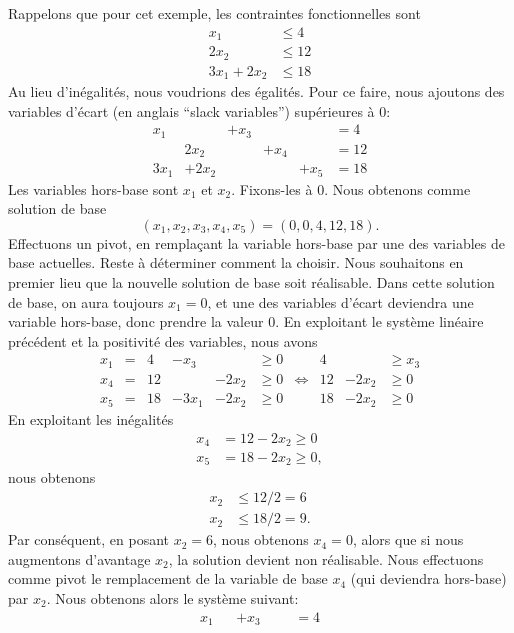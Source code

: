 \begin{example}
Rappelons que pour cet exemple, les contraintes fonctionnelles sont
\begin{eqnarray*}
x_1 & \leq 4 \\
2x_2 & \leq 12 \\
3x_1 + 2x_2 & \leq 18
\end{eqnarray*}
Au lieu d'inégalités, nous voudrions des égalités.
Pour ce faire, nous ajoutons des variables d'écart (en anglais ``slack variables'') supérieures à 0:
\[
\begin{matrix}
x_1 & & + x_3 & & & = 4 \\
& 2x_2 & & + x_4 & &  = 12\\
3x_1 & + 2x_2 & & & +x_5 & = 18
\end{matrix}
\]
Les variables hors-base sont $x_1$ et $x_2$. Fixons-les à 0.
Nous obtenons comme solution de base
\[
(x_1, x_2, x_3, x_4, x_5) = (0, 0, 4, 12, 18).
\]
Effectuons un pivot, en remplaçant la variable hors-base par une des variables de base actuelles.
Reste à déterminer comment la choisir.
Nous souhaitons en premier lieu que la nouvelle solution de base soit réalisable.
Dans cette solution de base, on aura toujours $x_1 = 0$, et une des variables d'écart deviendra une variable hors-base, donc prendre la valeur 0.
En exploitant le système linéaire précédent et la positivité des variables, nous avons
\[
\begin{matrix}
x_1 & = & 4 & -x_3 & & \geq 0 & & 4 & & \geq x_3 \\
x_4 & = & 12 & & -2x_2 & \geq 0 & \Leftrightarrow & 12 & -2x_2 & \geq 0 \\
x_5 & = & 18 & -3x_1 & -2x_2 & \geq 0 & & 18 & -2x_2 & \geq 0
\end{matrix}
\]
En exploitant les inégalités
\begin{align*}
x_4 &= 12 - 2x_2 \geq 0 \\
x_5 &= 18 - 2x_2 \geq 0,
\end{align*}
nous obtenons
\begin{align*}
x_2 &\leq 12/2 = 6 \\
x_2 &\leq 18/2 = 9.
\end{align*}
Par conséquent, en posant $x_2 = 6$, nous obtenons $x_4 = 0$, alors que si nous augmentons d'avantage $x_2$, la solution devient non réalisable.
Nous effectuons comme pivot le remplacement de la variable de base $x_4$ (qui deviendra hors-base) par $x_2$.
Nous obtenons alors le système suivant:
\[
\begin{matrix}
x_1 & & + x_3 & & & = 4 \\

\end{matrix}\]
\end{example}
